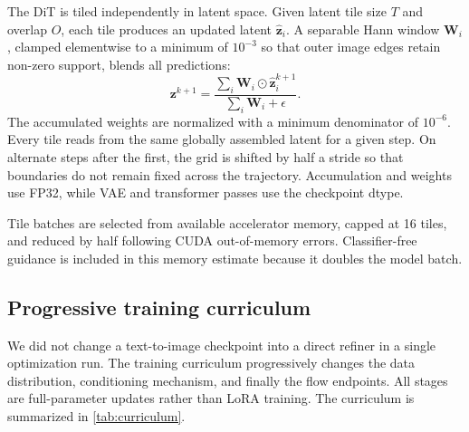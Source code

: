 \documentclass[10pt]{article}
\begin{document}
The DiT is tiled independently in latent space. Given latent tile size $T$ and
overlap $O$, each tile produces an updated latent $\widehat{\bm{z}}_i$. A
separable Hann window $\bm{W}_i$, clamped elementwise to a minimum of
$10^{-3}$ so that outer image edges retain non-zero support, blends all
predictions:
\begin{equation}
  \bm{z}^{k+1} =
  \frac{\sum_i \bm{W}_i\odot\widehat{\bm{z}}_i^{k+1}}
       {\sum_i \bm{W}_i+\epsilon}.
\end{equation}
The accumulated weights are normalized with a minimum denominator of
$10^{-6}$. Every tile reads from the same globally assembled latent for a
given step. On alternate steps after the first, the grid is shifted by half a
stride so that boundaries do not remain fixed across the trajectory.
Accumulation and weights use FP32, while VAE and transformer passes use the
checkpoint dtype.

Tile batches are selected from available accelerator memory, capped at 16
tiles, and reduced by half following CUDA out-of-memory errors. Classifier-free
guidance is included in this memory estimate because it doubles the model
batch.

\subsection{Progressive training curriculum}
\label{sec:training}

We did not change a text-to-image checkpoint into a direct refiner in a single
optimization run. The training curriculum progressively changes the data
distribution, conditioning mechanism, and finally the flow endpoints. All
stages are full-parameter updates rather than LoRA training. The curriculum is
summarized in \cref{tab:curriculum}.
\end{document}
